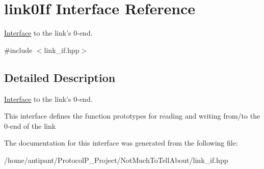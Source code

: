 \hypertarget{interfacelink0If}{\section{link0\-If Interface Reference}
\label{interfacelink0If}
}


\hyperlink{classInterface}{Interface} to the link's 0-\/end.  




{\ttfamily \#include $<$link\-\_\-if.\-hpp$>$}



\subsection{Detailed Description}
\hyperlink{classInterface}{Interface} to the link's 0-\/end. 

This interface defines the function prototypes for reading and writing from/to the 0-\/end of the link 

The documentation for this interface was generated from the following file\-:\begin{DoxyCompactItemize}
\item 
/home/antipant/\-Protocol\-P\-\_\-\-Project/\-Not\-Much\-To\-Tell\-About/link\-\_\-if.\-hpp\end{DoxyCompactItemize}
